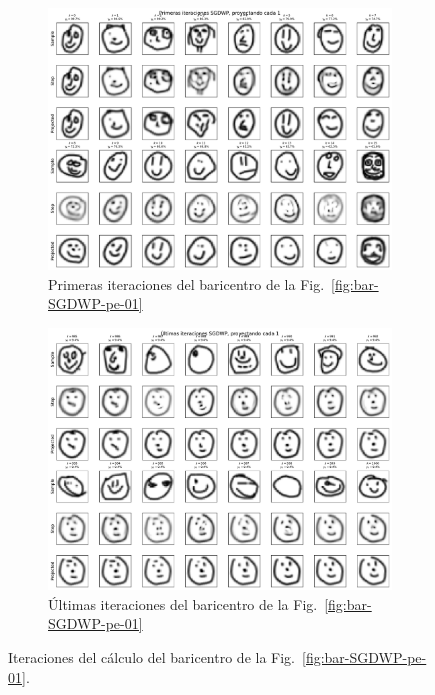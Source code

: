\begin{figure}[htbp]
    \centering
    \begin{subfigure}[b]{0.8\textwidth}
        \centering
        \includegraphics[width=\textwidth]{img/sgdwp-pe-iters/first-iters-pe-01.pdf}
        \caption{Primeras iteraciones del baricentro de la Fig.~\ref{fig:bar-SGDWP-pe-01}}
        \label{fig:first-iters-pe-01}
    \end{subfigure}
    \begin{subfigure}[b]{0.8\textwidth}
        \centering
        \includegraphics[width=\textwidth]{img/sgdwp-pe-iters/last-iters-pe-01.pdf}
        \caption{Últimas iteraciones del baricentro de la Fig.~\ref{fig:bar-SGDWP-pe-01}}
        \label{fig:last-iters-pe-01}
    \end{subfigure}
    \caption{Iteraciones del cálculo del baricentro de la Fig.~\ref{fig:bar-SGDWP-pe-01}.}
    \label{fig:iters-pe-01}
\end{figure}

